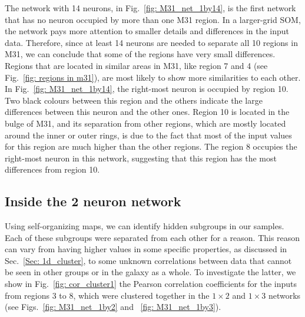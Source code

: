         The network with 14 neurons, in Fig.~\ref{fig: M31_net_1by14}, is the first network that has no neuron occupied by more than one M31 region.
        In a larger-grid SOM, the network pays more attention to smaller details and differences in the input data.
        Therefore, since at least 14 neurons are needed to separate all 10 regions in M31, we can conclude that some of the regions have very small differences.
        Regions that are located in similar areas in M31, like region 7 and 4 (see Fig.~\ref{fig: regions in m31}), are most likely to show more similarities to each other.
        In Fig.~\ref{fig: M31_net_1by14}, the right-most neuron is occupied by region 10.
        Two black colours between this region and the others indicate the large differences between this neuron and the other ones.
       Region 10 is located in the bulge of M31, and its separation from other regions, which are mostly located around the inner or outer rings, is due to the fact that most of the input values for this region are much higher than the other regions. %
        The region 8 occupies the right-most neuron in this network, suggesting that this region has the most differences from region 10.
        
        
    \subsection{Inside the 2 neuron network}
        \label{sec: inside_the_2_neurons}
        Using self-organizing maps, we can identify hidden subgroups in our samples. 
        Each of these subgroups were separated from each other for a reason.
        This reason can vary from having higher values in some specific properties, as discussed in Sec.~\ref{Sec: 1d_cluster}, to some unknown correlations between data that cannot be seen in other groups or in the galaxy as a whole.
        To investigate the latter, we show in Fig.~\ref{fig: cor_cluster1} the Pearson correlation coefficients for the inputs from regions 3 to 8, which were clustered together in the $1\times2$ and $1\times3$ networks (see Figs.~\ref{fig: M31_net_1by2} and ~\ref{fig: M31_net_1by3}).
        
